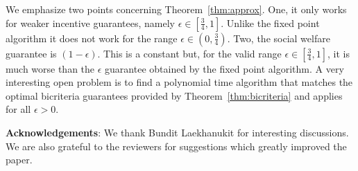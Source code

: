 We emphasize two points concerning Theorem~\ref{thm:approx}. One, it only works for weaker incentive guarantees, namely 
$\epsilon\in[\frac{3}{4},1]$. Unlike the fixed point algorithm it does not work for the range $\epsilon\in (0,\frac34)$.
Two, the social welfare guarantee is $(1-\epsilon)$. This is a constant but, for the valid range $\epsilon\in[\frac{3}{4},1]$, it is much worse 
than the $\epsilon$ guarantee obtained by the fixed point algorithm. 
A very interesting open problem is to find a polynomial time algorithm that matches the optimal bicriteria
guarantees provided by Theorem~\ref{thm:bicriteria} and applies for all $\epsilon>0$.

\vspace*{0.5cm}

\noindent \textbf{Acknowledgements}: We thank Bundit Laekhanukit for interesting discussions. We are also grateful to the reviewers for suggestions which greatly improved the paper.

